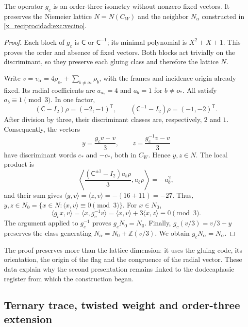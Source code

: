 \begin{proposition}
\label{x_reciprocidad:km:estabilidad-vecino}
The operator \(g_c\) is an order-three isometry without nonzero fixed
vectors. It preserves the Niemeier lattice \(N=N(C_W)\) and the neighbor
\(N_\alpha\) constructed in \eqref{x_reciprocidad:exc:vecino}.
\end{proposition}
\begin{proof}
Each block of \(g_c\) is \(\mathsf C\) or \(\mathsf C^{-1}\);
its minimal polynomial is \(X^2+X+1\). This proves the order and
absence of fixed vectors. Both blocks act trivially on the
discriminant, so they preserve each gluing class and therefore
the lattice \(N\).

Write \(v=v_\alpha=4\rho_{o_*}+\sum_{b\ne o_*}\rho_b\),
with the frames and incidence origin already fixed. Its radial
coefficients are \(a_{o_*}=4\) and \(a_b=1\) for \(b\ne o_*\).
All satisfy \(a_b\equiv1\pmod3\). In one factor,
\[
 (\mathsf C-I_2)\rho=(-2,-1)^{\mathsf T},\qquad
 (\mathsf C^{-1}-I_2)\rho=(-1,-2)^{\mathsf T}.
\]
After division by three, their discriminant classes are,
respectively, \(2\) and \(1\). Consequently, the vectors
\begin{equation}
 y=\frac{g_cv-v}{3},\qquad z=\frac{g_c^{-1}v-v}{3}
 \label{x_reciprocidad:km:desplazamientos}
\end{equation}
have discriminant words \(c_*\) and \(-c_*\), both in
\(C_W\). Hence \(y,z\in N\). The local product is
\[
 \left\langle
 \frac{(\mathsf C^{\pm1}-I_2)a_b\rho}{3},a_b\rho
 \right\rangle=-a_b^2,
\]
and their sum gives
\(\langle y,v\rangle=\langle z,v\rangle=-(16+11)=-27\).
Thus, \(y,z\in N_0=\{x\in N:\langle x,v\rangle\equiv0\pmod3\}\).
For \(x\in N_0\),
\[
 \langle g_cx,v\rangle
 =\langle x,g_c^{-1}v\rangle
 =\langle x,v\rangle+3\langle x,z\rangle\equiv0\pmod3.
\]
The argument applied to \(g_c^{-1}\) proves \(g_cN_0=N_0\).
Finally, \(g_c(v/3)=v/3+y\) preserves the class generating
\(N_\alpha=N_0+\mathbb Z(v/3)\). We obtain
\(g_cN_\alpha=N_\alpha\).
\end{proof}

The proof preserves more than the lattice dimension: it uses the gluing
code, its orientation, the origin of the flag and the congruence of the
radial vector. These data explain why the second presentation
remains linked to the dodecaphasic register from which the construction began.

\subsection{Ternary trace, twisted weight and order-three extension}
\label{x_reciprocidad:km:orbifold-tres}

